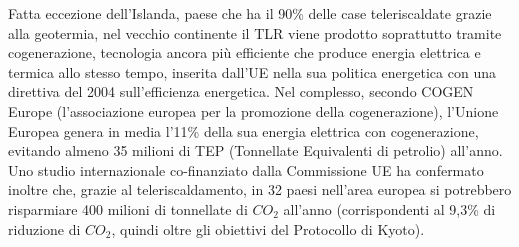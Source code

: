 \documentclass[laurea,oneside,11pt]{USiena_tesiLM}
\begin{document}

Fatta eccezione dell’Islanda, paese che ha il 90\% delle case teleriscaldate grazie alla geotermia, nel vecchio continente il TLR viene prodotto soprattutto tramite cogenerazione, tecnologia ancora più efficiente che produce energia elettrica e termica allo stesso tempo, inserita dall'UE nella sua politica energetica con una direttiva del 2004 sull'efficienza energetica.
Nel complesso, secondo COGEN Europe (l'associazione europea per la promozione della cogenerazione), l'Unione Europea genera in media l'11\% della sua energia elettrica con cogenerazione, evitando almeno 35 milioni di TEP (Tonnellate Equivalenti di petrolio) all'anno. Uno studio internazionale co-finanziato dalla Commissione UE ha confermato inoltre che, grazie al teleriscaldamento, in 32 paesi nell'area europea si potrebbero risparmiare 400 milioni di tonnellate di $CO_2$ all'anno (corrispondenti al 9,3\% di riduzione di $CO_2$, quindi oltre gli obiettivi del Protocollo di Kyoto).\\
\end{document}
